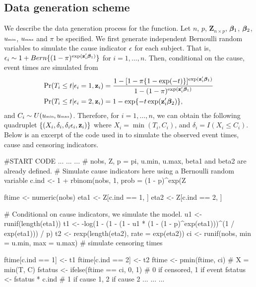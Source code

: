 \begin{appendix}

\section{Data generation scheme} 
\label{app3:data}
We describe the data generation process for the  function. Let $n$, $p$, $\mathbf{Z}_{n \times p}$, $\bm \beta_1$, $\bm \beta_2$, $u\mbox{\tiny{min}}$, $u\mbox{\tiny{max}}$ and $\pi$ be specified. We first generate independent Bernoulli random variables to simulate the cause indicator $\epsilon$ for each subject. That is, $\epsilon_i \sim 1 + Bern\{(1 - \pi)^{\exp(\mathbf{z}_i^\prime \bm \beta_1)}\}$ for $i = 1, \ldots, n$. Then, conditional on the cause, event times are simulated from 
\begin{align*}
\Pr(T_i \leq t | \epsilon_i = 1, \mathbf{z}_i) & = \frac{1 - [1 - \pi\{1 - \exp(-t)\}]^{\exp(\mathbf{z}_i^\prime\bm \beta_1)}}{1 - (1 - \pi)^{\exp(\mathbf{z}_i^\prime\bm \beta_1)}} \\
\Pr(T_i \leq t | \epsilon_i = 2, \mathbf{z}_i) & = 1 - \exp\{-t\exp(\mathbf{z}_i^\prime\bm \beta_2)\}, \\
\end{align*}
and $C_i \sim U(u\mbox{\tiny{min}}, u\mbox{\tiny{max}})$. Therefore, for $i = 1, \ldots, n$, we can obtain the following quadruplet $\{(X_i, \delta_i, \delta_i \epsilon_i, \mathbf{z}_i)\}$ where $X_i = \min(T_i, C_i)$,  and $\delta_i = I(X_i \leq C_i)$. Below is an excerpt of the code used in  to simulate the observed event times, cause and censoring indicators.

\begin{example}
#START CODE
...
...
...
# nobs, Z, p = pi, u.min, u.max, beta1 and beta2 are already defined.
# Simulate cause indicators here using a Bernoulli random variable
c.ind <- 1 + rbinom(nobs, 1, prob = (1 - p)^exp(Z %

ftime <- numeric(nobs)
eta1 <- Z[c.ind == 1, ] %
eta2 <- Z[c.ind == 2, ] %

# Conditional on cause indicators, we simulate the model.
u1 <- runif(length(eta1))
t1 <- -log(1 - (1 - (1 - u1 * (1 - (1 - p)^exp(eta1)))^(1 / exp(eta1))) / p)
t2 <- rexp(length(eta2), rate = exp(eta2))
ci <- runif(nobs, min = u.min, max = u.max) # simulate censoring times

ftime[c.ind == 1] <- t1
ftime[c.ind == 2] <- t2 
ftime <- pmin(ftime, ci) # X = min(T, C)
fstatus <- ifelse(ftime == ci, 0, 1) # 0 if censored, 1 if event 
fstatus <- fstatus * c.ind  # 1 if cause 1, 2 if cause 2   
...
...
...            
\end{example}

\end{appendix}


